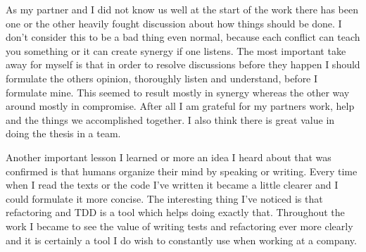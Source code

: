As my partner and I did not know us well at the start of the work there has been one or the other heavily fought discussion about how things should be done. I don’t consider this to be a bad thing even normal, because each conflict can teach you something or it can create synergy if one listens. The most important take away for myself is that in order to resolve discussions before they happen I should formulate the others opinion, thoroughly listen and understand, before I formulate mine. This seemed to result mostly in synergy whereas the other way around mostly in compromise. After all I am grateful for my partners work, help and the things we accomplished together. I also think there is great value in doing the thesis in a team. 

Another important lesson I learned or more an idea I heard about that was confirmed is that humans organize their mind by speaking or writing. Every time when I read the texts or the code I’ve written it became a little clearer and I could formulate it more concise. The interesting thing I’ve noticed is that refactoring and TDD is a tool which helps doing exactly that. Throughout the work I became to see the value of writing tests and refactoring ever more clearly and it is certainly a tool I do wish to constantly use when working at a company.

